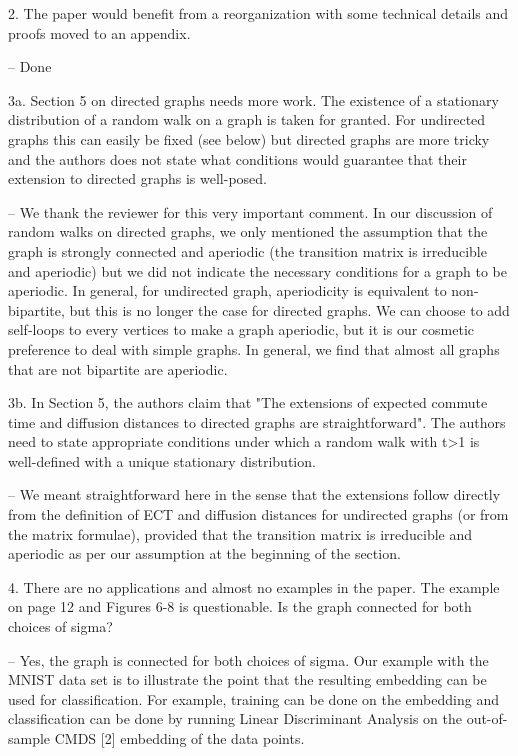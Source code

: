 2. The paper would benefit from a reorganization with some technical
details and proofs moved to an appendix. 

-- Done

3a. Section 5 on directed graphs needs more work. The existence of a
stationary distribution of a random walk on a graph is taken for
granted. For undirected graphs this can easily be fixed (see below)
but directed graphs are more tricky and the authors does not state
what conditions would guarantee that their extension to directed
graphs is well-posed.

-- We thank the reviewer for this very important comment. In our
discussion of random walks on directed graphs, we only mentioned the
assumption that the graph is strongly connected and aperiodic (the
transition matrix is irreducible and aperiodic) but we did not
indicate the necessary conditions for a graph to be aperiodic. In
general, for undirected graph, aperiodicity is equivalent to
non-bipartite, but this is no longer the case for directed
graphs. We can choose to add self-loops to every vertices to make a
graph aperiodic, but it is our cosmetic preference to deal with simple
graphs. In general, we find that almost all graphs that are not
bipartite are aperiodic.

3b. In Section 5, the authors claim that "The extensions of expected
commute time and diffusion distances to directed graphs are
straightforward". The authors need to state appropriate conditions
under which a random walk with t>1 is well-defined with a unique
stationary distribution.

-- We meant straightforward here in the sense that the extensions
follow directly from the definition of ECT and diffusion distances for
undirected graphs (or from the matrix formulae), provided that the
transition matrix is irreducible and aperiodic as per our assumption
at the beginning of the section. 

4. There are no applications and almost no examples in the paper. The
example on page 12 and Figures 6-8 is questionable. Is the graph
connected for both choices of sigma?

-- Yes, the graph is connected for both choices of sigma.
Our example with the MNIST data set is to illustrate the point that
the resulting embedding can be used for classification. For example,
training can be done on the embedding and classification can be done by
running Linear Discriminant Analysis on the out-of-sample CMDS [2]
embedding of the data points.

